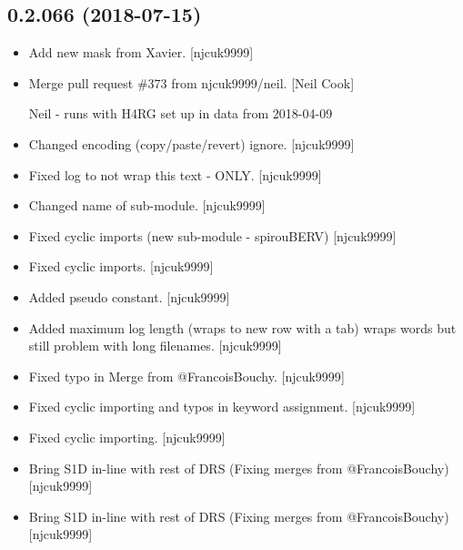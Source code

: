 \documentclass[a4paper,10pt,english]{report}
\begin{document}
\subsection{0.2.066 (2018-07-15)}
\label{\detokenize{misc/changelog:id393}}\begin{itemize}
\item {} 
Add new mask from Xavier. {[}njcuk9999{]}

\item {} 
Merge pull request \#373 from njcuk9999/neil. {[}Neil Cook{]}

Neil - runs with H4RG set up in data from 2018-04-09

\item {} 
Changed encoding (copy/paste/revert) \textendash{} ignore. {[}njcuk9999{]}

\item {} 
Fixed log to not wrap this text - ONLY. {[}njcuk9999{]}

\item {} 
Changed name of sub-module. {[}njcuk9999{]}

\item {} 
Fixed cyclic imports (new sub-module - spirouBERV) {[}njcuk9999{]}

\item {} 
Fixed cyclic imports. {[}njcuk9999{]}

\item {} 
Added  pseudo constant. {[}njcuk9999{]}

\item {} 
Added maximum log length (wraps to new row with a tab) wraps words but
still problem with long filenames. {[}njcuk9999{]}

\item {} 
Fixed typo in Merge from @FrancoisBouchy. {[}njcuk9999{]}

\item {} 
Fixed cyclic importing and typos in keyword assignment. {[}njcuk9999{]}

\item {} 
Fixed cyclic importing. {[}njcuk9999{]}

\item {} 
Bring S1D  in-line with rest of DRS (Fixing merges from
@FrancoisBouchy) {[}njcuk9999{]}

\item {} 
Bring S1D  in-line with rest of DRS (Fixing merges from
@FrancoisBouchy) {[}njcuk9999{]}


\end{itemize}
\end{document}
